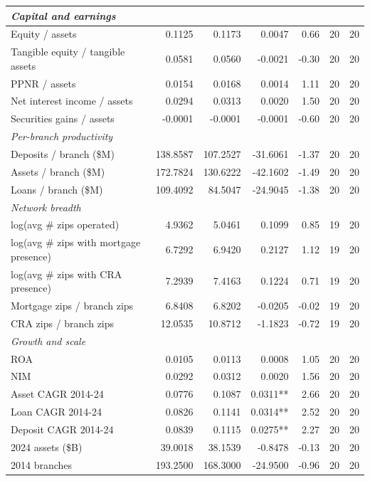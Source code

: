 \begin{tabular}{lrrrrrr}
\midrule
\multicolumn{7}{l}{\emph{Capital and earnings}} \\
\midrule
Equity / assets & 0.1125 & 0.1173 & 0.0047 & 0.66 & 20 & 20 \\
Tangible equity / tangible assets & 0.0581 & 0.0560 & -0.0021 & -0.30 & 20 & 20 \\
PPNR / assets & 0.0154 & 0.0168 & 0.0014 & 1.11 & 20 & 20 \\
Net interest income / assets & 0.0294 & 0.0313 & 0.0020 & 1.50 & 20 & 20 \\
Securities gains / assets & -0.0001 & -0.0001 & -0.0001 & -0.60 & 20 & 20 \\
\midrule
\multicolumn{7}{l}{\emph{Per-branch productivity}} \\
\midrule
Deposits / branch (\$M) & 138.8587 & 107.2527 & -31.6061 & -1.37 & 20 & 20 \\
Assets / branch (\$M) & 172.7824 & 130.6222 & -42.1602 & -1.49 & 20 & 20 \\
Loans / branch (\$M) & 109.4092 & 84.5047 & -24.9045 & -1.38 & 20 & 20 \\
\midrule
\multicolumn{7}{l}{\emph{Network breadth}} \\
\midrule
log(avg \# zips operated) & 4.9362 & 5.0461 & 0.1099 & 0.85 & 19 & 20 \\
log(avg \# zips with mortgage presence) & 6.7292 & 6.9420 & 0.2127 & 1.12 & 19 & 20 \\
log(avg \# zips with CRA presence) & 7.2939 & 7.4163 & 0.1224 & 0.71 & 19 & 20 \\
Mortgage zips / branch zips & 6.8408 & 6.8202 & -0.0205 & -0.02 & 19 & 20 \\
CRA zips / branch zips & 12.0535 & 10.8712 & -1.1823 & -0.72 & 19 & 20 \\
\midrule
\multicolumn{7}{l}{\emph{Growth and scale}} \\
\midrule
ROA & 0.0105 & 0.0113 & 0.0008 & 1.05 & 20 & 20 \\
NIM & 0.0292 & 0.0312 & 0.0020 & 1.56 & 20 & 20 \\
Asset CAGR 2014-24 & 0.0776 & 0.1087 & 0.0311** & 2.66 & 20 & 20 \\
Loan CAGR 2014-24 & 0.0826 & 0.1141 & 0.0314** & 2.52 & 20 & 20 \\
Deposit CAGR 2014-24 & 0.0839 & 0.1115 & 0.0275** & 2.27 & 20 & 20 \\
2024 assets (\$B) & 39.0018 & 38.1539 & -0.8478 & -0.13 & 20 & 20 \\
2014 branches & 193.2500 & 168.3000 & -24.9500 & -0.96 & 20 & 20 \\

\end{tabular}
